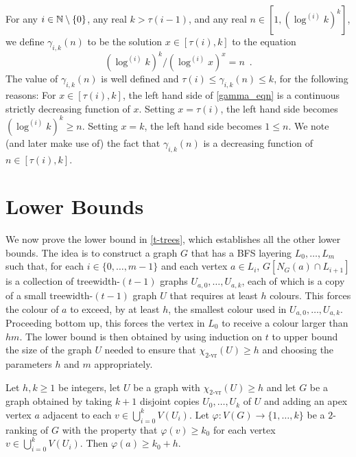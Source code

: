 \documentclass[kpfonts]{patmorin}
\newcommand{\rn}[1]{\chi_{\operatorname{#1-vr}}}
\newcommand{\trn}{\rn{2}}
\theoremstyle{named}
\begin{document}
For any $i\in\mathbb{N}\setminus\{0\}$, any real $k>\tau(i-1)$, and any real $n\in[1,(\log^{(i)} k)^k]$, we define $\gamma_{i,k}(n)$ to be the solution $x\in[\tau(i),k]$ to the equation
\begin{equation}
   (\log^{(i)} k)^k/(\log^{(i)} x)^{x}=n \enspace .  \label{gamma_eqn}
\end{equation}
The value of $\gamma_{i,k}(n)$ is well defined and $\tau(i)\le \gamma_{i,k}(n)\le k$, for the following reasons:  For $x\in[\tau(i),k]$, the left hand side of \cref{gamma_eqn} is a continuous strictly decreasing function of $x$. Setting $x=\tau(i)$, the left hand side becomes $(\log^{(i)} k)^k \ge n$. Setting $x=k$, the left hand side becomes $1\le n$.  We note (and later make use of) the fact that $\gamma_{i,k}(n)$ is a decreasing function of $n\in [\tau(i),k]$.

\section{Lower Bounds}
\label{lower-bounds}

We now prove the lower bound in \cref{t-trees}, which establishes all the other lower bounds. The idea is to construct a graph $G$ that has a BFS layering $L_0,\ldots,L_m$ such that, for each $i\in\{0,\ldots,m-1\}$ and each vertex $a\in L_i$, $G[N_G(a)\cap L_{i+1}]$ is a collection of treewidth-$(t-1)$ graphs $U_{a,0},\ldots,U_{a,k}$, each of which is a copy of a small treewidth-$(t-1)$ graph $U$ that requires at least $h$ colours.  This forces the colour of $a$ to exceed, by at least $h$, the smallest colour used in $U_{a,0},\ldots,U_{a,k}$.  Proceeding bottom up, this forces the vertex in $L_0$ to receive a colour larger than $hm$.  The lower bound is then obtained by using induction on $t$ to upper bound the size of the graph $U$ needed to ensure that $\trn(U)\ge h$ and choosing the parameters $h$ and $m$ appropriately.

\begin{lem}\label{apex-graph}
    Let $h,k\ge 1$ be integers, let $U$ be a graph with $\trn(U)\ge h$ and let $G$ be a graph obtained by taking $k+1$ disjoint copies $U_0,\ldots,U_k$ of $U$ and adding an apex vertex $a$ adjacent to each $v\in\bigcup_{i=0}^k V(U_i)$.  Let $\varphi:V(G)\to\{1,\ldots,k\}$ be a $2$-ranking of $G$ with the property that $\varphi(v)\ge k_0$ for each vertex $v\in\bigcup_{i=0}^k V(U_i)$.  Then $\varphi(a) \ge k_0+h$.
\end{lem}
\end{document}
